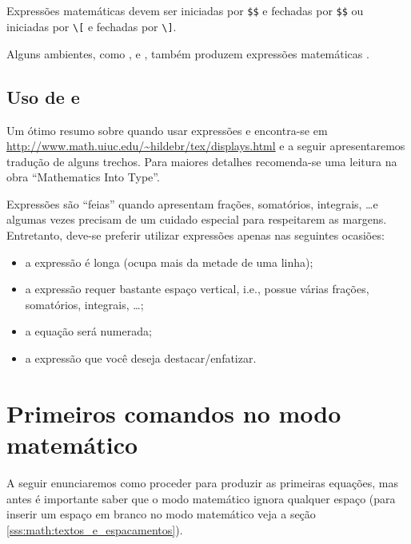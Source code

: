 \subsection{}
Expressões matemáticas  devem ser iniciadas por \lstinline!$$! e fechadas por \lstinline!$$! ou iniciadas por \lstinline!\[! e fechadas por \lstinline!\]!. \\

Alguns ambientes, como ,  e , também produzem expressões matemáticas .

\subsection{Uso de  e }
Um \'{o}timo resumo sobre quando usar express\~{o}es  e  encontra-se em \url{http://www.math.uiuc.edu/~hildebr/tex/displays.html}\nocite{Hildebrand:TeX_Resoures} e a seguir apresentaremos tradu\c{c}\~{a}o de alguns trechos. Para maiores detalhes recomenda-se uma leitura na obra ``Mathematics Into Type''\nocite{Swanson:1999:Mathematics}.

Express\~{o}es  s\~{a}o ``feias'' quando apresentam fra\c{c}\~{o}es, somat\'{o}rios, integrais, \ldots e algumas vezes precisam de um cuidado especial para respeitarem as margens. Entretanto, deve-se preferir utilizar express\~{o}es  apenas nas seguintes ocasi\~{o}es:
\begin{itemize}
    \item a express\~{a}o \'{e} longa (ocupa mais da metade de uma linha);
    \item a express\~{a}o requer bastante espa\c{c}o vertical, i.e., possue v\'{a}rias fra\c{c}\~{o}es, somat\'{o}rios, integrais, \ldots;
    \item a equa\c{c}\~{a}o ser\'{a} numerada;
    \item a express\~{a}o que voc\^{e} deseja destacar/enfatizar.
\end{itemize}

\section{Primeiros comandos no modo matemático}
A seguir enunciaremos como proceder para produzir as primeiras equações, mas antes é importante saber que o modo matemático ignora qualquer espaço (para inserir um espa\c{c}o em branco no modo matem\'{a}tico veja a se\c{c}\~{a}o \ref{sss:math:textos_e_espacamentos}).

